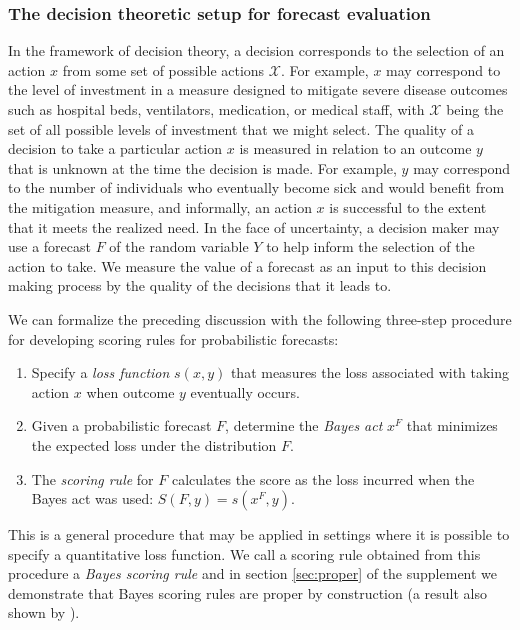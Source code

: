 \documentclass{article}\usepackage[]{graphicx}\usepackage[]{xcolor}
\begin{document}
\subsubsection{The decision theoretic setup for forecast evaluation}
\label{sec:methods.detailed.decisiontheory}


In the framework of decision theory, a decision corresponds to the selection of an action $x$ from some set of possible actions $\mathcal{X}$. For example, $x$ may correspond to the level of investment in a measure designed to mitigate severe disease outcomes such as hospital beds, ventilators, medication, or medical staff, with $\mathcal{X}$ being the set of all possible levels of investment that we might select. The quality of a decision to take a particular action $x$ is measured in relation to an outcome $y$ that is unknown at the time the decision is made. For example, $y$ may correspond to the number of individuals who eventually become sick and would benefit from the mitigation measure, and informally, an action $x$ is successful to the extent that it meets the realized need. In the face of uncertainty, a decision maker may use a forecast $F$ of the random variable $Y$ to help inform the selection of the action to take. We measure the value of a forecast as an input to this decision making process by the quality of the decisions that it leads to.

We can formalize the preceding discussion with the following three-step procedure for developing scoring rules for probabilistic forecasts:
\begin{enumerate}
\item Specify a \emph{loss function} $s(x, y)$ that measures the loss associated with taking action $x$ when outcome $y$ eventually occurs.
\item Given a probabilistic forecast $F$, determine the \emph{Bayes act} $x^F$ that minimizes the expected loss under the distribution $F$.
\item The \emph{scoring rule} for $F$ calculates the score as the loss incurred when the Bayes act was used: $S(F, y) = s(x^F, y)$.
\end{enumerate}
This is a general procedure that may be applied in settings where it is possible to specify a quantitative loss function. We call a scoring rule obtained from this procedure a \emph{Bayes scoring rule} and in section \ref{sec:proper} of the
supplement we demonstrate that Bayes scoring rules are proper by construction (a result also shown by \cite{dawid2007geometry,gneiting2007strictly}).
\end{document}
